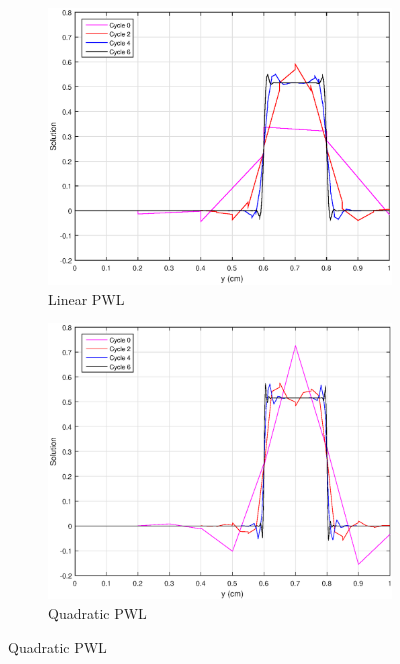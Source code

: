 \begin{figure}
\centering
{
	\begin{subfigure}[b]{0.45\textwidth}
		\centering
		\label{subfig::SL_uniform_ef_wach}
		\includegraphics[width=\textwidth]{figures/sec_BF/SL_PWLD_k1_uniform.eps}
		\caption{Linear PWL}
	\end{subfigure}
	\hfill
	\begin{subfigure}[b]{0.45\textwidth}
		\centering
		\label{subfig::SL_uniform_ef_wach}
		\includegraphics[width=\textwidth]{figures/sec_BF/SL_PWLD_k2_uniform.eps}
		\caption{Quadratic PWL}
	\end{subfigure}
}
\end{figure}

